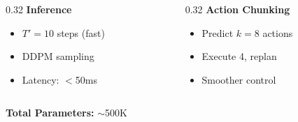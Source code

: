 \documentclass[aspectratio=169,9pt]{beamer}
\begin{document}
\begin{frame}
\begin{columns}[T]
\begin{column}{0.32\textwidth}
\textbf{\small Inference}
\begin{itemize}\setlength{\itemsep}{1pt}
    \item[\tiny$\bullet$] \footnotesize $T' = 10$ steps (fast)
    \item[\tiny$\bullet$] \footnotesize DDPM sampling
    \item[\tiny$\bullet$] \footnotesize Latency: $<$50ms
\end{itemize}
\end{column}

\begin{column}{0.32\textwidth}
\textbf{\small Action Chunking}
\begin{itemize}\setlength{\itemsep}{1pt}
    \item[\tiny$\bullet$] \footnotesize Predict $k=8$ actions
    \item[\tiny$\bullet$] \footnotesize Execute 4, replan
    \item[\tiny$\bullet$] \footnotesize Smoother control
\end{itemize}
\end{column}
\end{columns}

\vspace{0.2cm}
\centering
\textbf{\small Total Parameters:} $\sim$500K
\end{frame}
\end{document}
